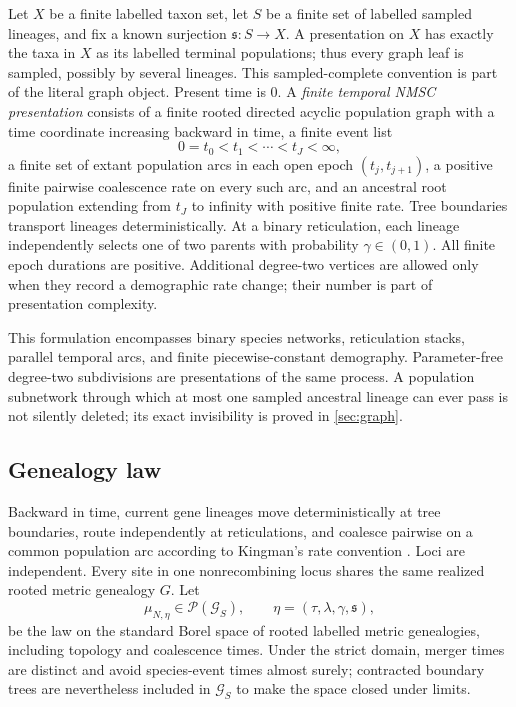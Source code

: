 \documentclass[11pt]{article}
\newcommand{\cP}{\mathcal P}
\newcommand{\cG}{\mathcal G}
\begin{document}
Let $X$ be a finite labelled taxon set, let $S$ be a finite set of labelled sampled lineages, and fix a known surjection $\mathfrak s:S\to X$.  A presentation on $X$ has exactly the taxa in $X$ as its labelled terminal populations; thus every graph leaf is sampled, possibly by several lineages.  This sampled-complete convention is part of the literal graph object.  Present time is $0$.  A \emph{finite temporal NMSC presentation} consists of a finite rooted directed acyclic population graph with a time coordinate increasing backward in time, a finite event list
\[
0=t_0<t_1<\cdots<t_J<\infty,
\]
a finite set of extant population arcs in each open epoch $(t_j,t_{j+1})$, a positive finite pairwise coalescence rate on every such arc, and an ancestral root population extending from $t_J$ to infinity with positive finite rate.  Tree boundaries transport lineages deterministically.  At a binary reticulation, each lineage independently selects one of two parents with probability $\gamma\in(0,1)$.  All finite epoch durations are positive.  Additional degree-two vertices are allowed only when they record a demographic rate change; their number is part of presentation complexity.

This formulation encompasses binary species networks, reticulation stacks, parallel temporal arcs, and finite piecewise-constant demography.  Parameter-free degree-two subdivisions are presentations of the same process.  A population subnetwork through which at most one sampled ancestral lineage can ever pass is not silently deleted; its exact invisibility is proved in \cref{sec:graph}.

\subsection{Genealogy law}

Backward in time, current gene lineages move deterministically at tree boundaries, route independently at reticulations, and coalesce pairwise on a common population arc according to Kingman's rate convention \citep{Kingman1982}.  Loci are independent.  Every site in one nonrecombining locus shares the same realized rooted metric genealogy $G$.  Let
\[
\mu_{N,\eta}\in\cP(\cG_S),\qquad \eta=(\tau,\lambda,\gamma,\mathfrak s),
\]
be the law on the standard Borel space of rooted labelled metric genealogies, including topology and coalescence times.  Under the strict domain, merger times are distinct and avoid species-event times almost surely; contracted boundary trees are nevertheless included in $\cG_S$ to make the space closed under limits.
\end{document}
